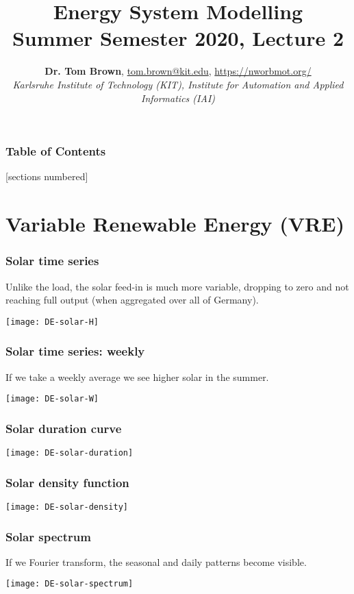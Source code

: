 \documentclass[10pt,aspectratio=169,dvipsnames]{beamer}
\title{Energy System Modelling\\ Summer Semester 2020, Lecture 2}
\author{
  {\bf Dr. Tom Brown}, \href{mailto:tom.brown@kit.edu}{tom.brown@kit.edu}, \url{https://nworbmot.org/}\\
  \emph{Karlsruhe Institute of Technology (KIT), Institute for Automation and Applied Informatics (IAI)}
}
\date{}
\begin{document}
\maketitle


\begin{frame}

  \frametitle{Table of Contents}
  [sections numbered]
  \tableofcontents[hideallsubsections]
\end{frame}


\section{Variable Renewable Energy (VRE)}



\begin{frame}
  \frametitle{Solar time series}

  Unlike the load, the solar feed-in is much more variable, dropping to zero and not reaching full output (when aggregated over all of Germany).


  \centering
  \texttt{[image: DE-solar-H]}

\end{frame}


\begin{frame}
  \frametitle{Solar time series: weekly}

  If we take a weekly average we see higher solar in the summer.

  \centering
  \texttt{[image: DE-solar-W]}

\end{frame}



\begin{frame}
  \frametitle{Solar duration curve}



  \centering
  \texttt{[image: DE-solar-duration]}

\end{frame}




\begin{frame}
  \frametitle{Solar density function}

  \centering
  \texttt{[image: DE-solar-density]}

\end{frame}




\begin{frame}
  \frametitle{Solar spectrum}

  If we Fourier transform, the \alert{seasonal} and \alert{daily} patterns become visible.

  \centering
  \texttt{[image: DE-solar-spectrum]}

\end{frame}
\end{document}
